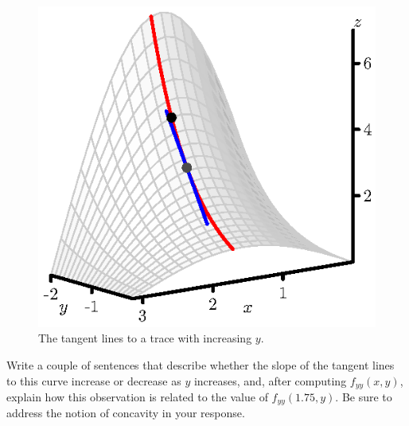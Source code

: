 \begin{activity}
\begin{figure}[ht]
\begin{center}
    \includegraphics[scale=0.8]{figures/fig_10_3_fyy_3.eps}
  \end{center}
  \caption{The tangent lines to a trace with increasing $y$.}
  \label{F:10.3.fyy}
\end{figure}
Write a couple of sentences that describe whether the slope of the tangent lines to this curve increase or decrease as $y$ increases, and, after computing $f_{yy}(x,y)$, explain how this observation is related to the value of $f_{yy}(1.75,y)$.  Be sure to address the notion of concavity in your response.


\end{activity}
